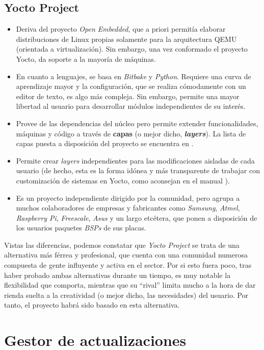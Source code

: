 \subsection{Yocto Project}

\begin{itemize}
	\item Deriva del proyecto \textit{Open Embedded}, que a priori permitía elaborar distribuciones de Linux propias solamente para la arquitectura QEMU (orientada a virtualización). Sin embargo, una vez conformado el proyecto Yocto, da soporte a la mayoría de máquinas.
	\item En cuanto a lenguajes, se basa en \textit{Bitbake} y \textit{Python}. Requiere una curva de aprendizaje mayor y la configuración, que se realiza cómodamente con un editor de texto, es algo más compleja. Sin embargo, permite una mayor libertad al usuario para desarrollar módulos independientes de su interés.
	\item Provee de las dependencias del núcleo pero permite extender funcionalidades, máquinas y código a través de \textbf{capas} (o mejor dicho, \textbf{\textit{layers}}). La lista de capas puesta a disposición del proyecto se encuentra en \cite{yocto-layers-list}.
	\item Permite crear \textit{layers} independientes para las modificaciones aisladas de cada usuario (de hecho, esta es la forma idónea y más transparente de trabajar con customización de sistemas en Yocto, como aconsejan en el manual \cite{yocto-manual-own-distro}).
	\item Es un proyecto independiente dirigido por la comunidad, pero agrupa a muchos colaboradores de empresas y fabricantes como \textit{Samsung}, \textit{Atmel}, \textit{Raspberry Pi}, \textit{Freescale}, \textit{Asus} y un largo etcétera, que ponen a disposición de los usuarios paquetes \textit{BSPs} de sus placas.
\end{itemize}

Vistas las diferencias, podemos constatar que \textit{Yocto Project} se trata de una alternativa más férrea y profesional, que cuenta con una comunidad numerosa compuesta de gente influyente y activa en el sector. Por si esto fuera poco, tras haber probado ambas alternativas durante un tiempo, es muy notable la flexibilidad que comporta, mientras que su ``rival'' limita mucho a la hora de dar rienda suelta a la creatividad (o mejor dicho, las necesidades) del usuario. Por tanto, el proyecto habrá sido basado en esta alternativa.

\section{Gestor de actualizaciones}

